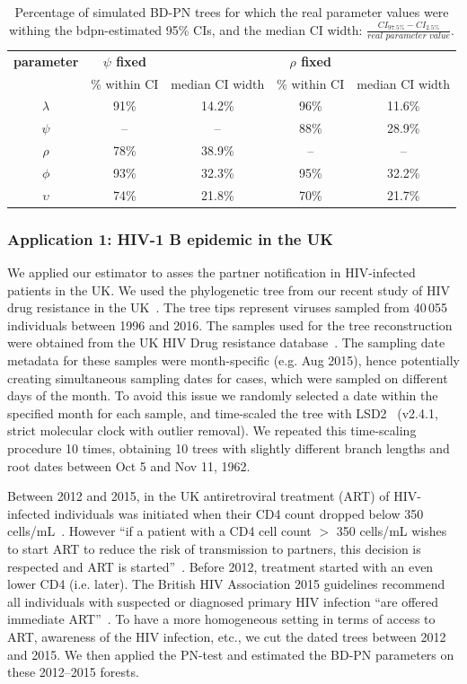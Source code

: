 \documentclass[10pt,letterpaper]{article}
\begin{document}
 \begin{table}[!h]\centering
\small
\caption{Percentage of simulated BD-PN trees for which the real parameter values were withing the bdpn-estimated 95\% CIs, and the median CI width: $\frac{CI_{97.5\%} - CI_{2.5\%}}{\textit{real parameter value}}$. \smallskip}
\begin{tabular}{c|cc|cc}
\textbf{parameter} & \textbf{$\psi$ fixed} & & \textbf{$\rho$ fixed} &  \\
 & \% within CI & median CI width & \% within CI & median CI width  \\
\toprule 
 $\lambda$ &  91\% & 14.2\% & 96\% & 11.6\%\\
 $\psi$ & -- & -- & 88\% & 28.9\% \\
 $\rho$ & 78\%  & 38.9\% & -- & -- \\
 $\phi$ & 93\% & 32.3\% & 95\% & 32.2\% \\
 $\upsilon$ & 74\% & 21.8\% & 70\% & 21.7\% \\
\bottomrule
\end{tabular}
\label{tbl:ci}
\end{table}


\subsubsection*{Application 1: HIV-1 B epidemic in the UK}
We applied our estimator to asses the partner notification in HIV-infected patients in the UK. We used the phylogenetic tree from our recent study of HIV drug resistance in the UK~\cite{zhukovaModelingDrugResistance2023}. The tree tips represent viruses sampled from 40\,055 individuals between 1996 and 2016. The samples used for the tree reconstruction were obtained from the UK HIV Drug resistance database~\cite{Dunn2007}. The sampling date metadata for these samples were month-specific (e.g. Aug 2015), hence potentially creating simultaneous sampling dates for cases, which were sampled on different days of the month. To avoid this issue we randomly selected a date within the specified month for each sample, and time-scaled the tree with LSD2~\cite{To2016} (v2.4.1, strict molecular clock with outlier removal). We repeated this time-scaling procedure 10 times, obtaining 10 trees with slightly different branch lengths and root dates between Oct 5 and Nov 11, 1962.

Between 2012 and 2015, in the UK antiretroviral treatment (ART) of HIV-infected individuals  was initiated when their CD4 count dropped below 350 cells/mL~\cite{williamsBritishHIVAssociation2012}. However ``if a patient with a CD4 cell count $>$ 350 cells/mL wishes to start ART to reduce the risk of transmission to partners, this decision is respected and ART is started''~\cite{williamsBritishHIVAssociation2012}. Before 2012, treatment started with an even lower CD4 (i.e. later). The British HIV Association 2015 guidelines recommend all individuals with suspected or diagnosed primary HIV infection ``are offered immediate ART''~\cite{churchillBritishHIVAssociation2016}. To have a more homogeneous setting in terms of access to ART, awareness of the HIV infection, etc., we cut the dated trees between 2012 and 2015. We then applied the PN-test and estimated the BD-PN parameters on these 2012--2015 forests. 
\end{document}
